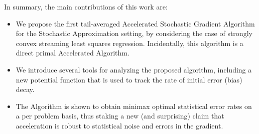 In summary, the main contributions of this work are:
\begin{itemize}
\item We propose the first tail-averaged Accelerated Stochastic Gradient Algorithm for the Stochastic Approximation setting, by considering the case of strongly convex streaming least squares regression. Incidentally, this algorithm is a direct primal Accelerated Algorithm.
\item We introduce several tools for analyzing the proposed algorithm, including a new potential function that is used to track the rate of initial error (bias) decay.
\item The Algorithm is shown to obtain minimax optimal statistical error rates on a per problem basis, thus staking a new (and surprising) claim that acceleration is robust to statistical noise and errors in the gradient.
\end{itemize}